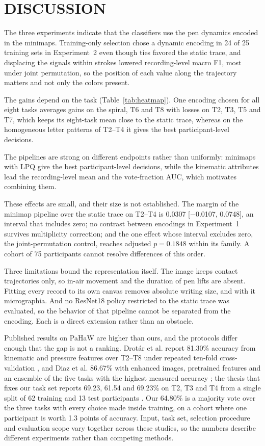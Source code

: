 \section{\uppercase{Discussion}}
\label{sec:discussion}

\noindent
The three experiments indicate that the classifiers use the pen dynamics encoded in the minimaps. Training-only selection chose a dynamic encoding in 24 of 25 training sets in Experiment~2 even though ties favored the static trace, and displacing the signals within strokes lowered recording-level macro F1, most under joint permutation, so the position of each value along the trajectory matters and not only the colors present.

The gains depend on the task (Table~\ref{tab:heatmap}). One encoding chosen for all eight tasks averages gains on the spiral, T6 and T8 with losses on T2, T3, T5 and T7, which keeps its eight-task mean close to the static trace, whereas on the homogeneous letter patterns of T2--T4 it gives the best participant-level decisions.

The pipelines are strong on different endpoints rather than uniformly: minimaps with LPQ give the best participant-level decisions, while the kinematic attributes lead the recording-level mean and the vote-fraction AUC, which motivates combining them.

These effects are small, and their size is not established. The margin of the minimap pipeline over the static trace on T2--T4 is 0.0307 [$-$0.0107, 0.0748], an interval that includes zero; no contrast between encodings in Experiment~1 survives multiplicity correction; and the one effect whose interval excludes zero, the joint-permutation control, reaches adjusted $p=0.1848$ within its family. A cohort of 75 participants cannot resolve differences of this order.

Three limitations bound the representation itself. The image keeps contact trajectories only, so in-air movement and the duration of pen lifts are absent. Fitting every record to its own canvas removes absolute writing size, and with it micrographia. And no ResNet18 policy restricted to the static trace was evaluated, so the behavior of that pipeline cannot be separated from the encoding. Each is a direct extension rather than an obstacle.

Published results on PaHaW are higher than ours, and the protocols differ enough that the gap is not a ranking. Drot\'ar et al. report 81.30\% accuracy from kinematic and pressure features over T2--T8 under repeated ten-fold cross-validation \cite{Drotar2016}, and Diaz et al. 86.67\% with enhanced images, pretrained features and an ensemble of the five tasks with the highest measured accuracy \cite{Diaz2019}; the thesis that fixes our task set reports 69.23, 61.54 and 69.23\% on T2, T3 and T4 from a single split of 62 training and 13 test participants \cite{Casademunt2023}. Our 64.80\% is a majority vote over the three tasks with every choice made inside training, on a cohort where one participant is worth 1.3 points of accuracy. Input, task set, selection procedure and evaluation scope vary together across these studies, so the numbers describe different experiments rather than competing methods.

